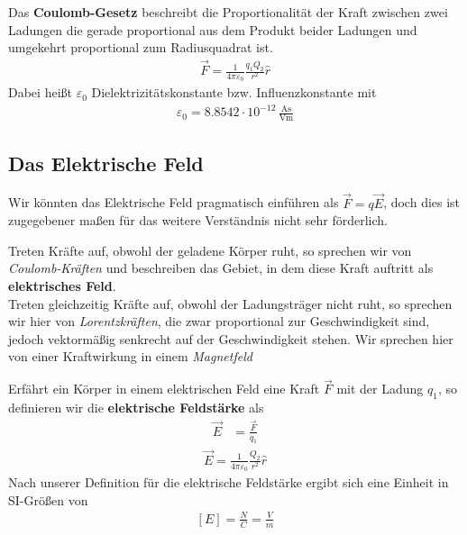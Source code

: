 Das \textbf{Coulomb-Gesetz} beschreibt die Proportionalität der Kraft zwischen zwei Ladungen die gerade proportional aus dem Produkt beider Ladungen und umgekehrt proportional zum Radiusquadrat ist.
\begin{align} \label{eqn:Coulomb-Gesetz}
\boxed{ \vec{F} = \frac{1}{4\pi \varepsilon_{0}} \frac{q_1 Q_2}{r^2} \hat{r}}
\end{align}Dabei heißt $\varepsilon_{0}$ Dielektrizitätskonstante bzw. Influenzkonstante mit\begin{align*}
\varepsilon_{0} = 8.8542 \cdot 10^{-12} \,\mathrm{ \frac{As}{Vm}}
\end{align*}
\subsection{Das Elektrische Feld}
Wir könnten das Elektrische Feld pragmatisch einführen als $\vec{F} = q\vec{E}$, doch dies ist zugegebener maßen für das weitere Verständnis nicht sehr förderlich. \par
Treten Kräfte auf, obwohl der geladene Körper ruht, so sprechen wir von \textit{Coulomb-Kräften} und beschreiben das Gebiet, in dem diese Kraft auftritt als \textbf{elektrisches Feld}. \\Treten gleichzeitig Kräfte auf, obwohl der Ladungsträger nicht ruht, so sprechen wir hier von \textit{Lorentzkräften}, die zwar proportional zur Geschwindigkeit sind, jedoch vektormäßig senkrecht auf der Geschwindigkeit stehen. Wir sprechen hier von einer Kraftwirkung in einem \textit{Magnetfeld} \par
Erfährt ein Körper in einem elektrischen Feld eine Kraft $\vec{F}$ mit der Ladung $q_1$, so definieren wir die \textbf{elektrische Feldstärke} als \begin{align}
\vec{E} &= \frac{\vec{F}}{q_1} 
\end{align}\begin{align} \label{eqn:elFeldstärke}
		\boxed{\vec{E}= \frac{1}{4\pi \varepsilon_{0}} \frac{Q_2}{r^2} \hat{r}}
\end{align} Nach unserer Definition für die elektrische Feldstärke ergibt sich eine Einheit in SI-Größen von \begin{align}\left[ E\right] = \frac{N}{C} = \frac{V}{m}
\end{align}
